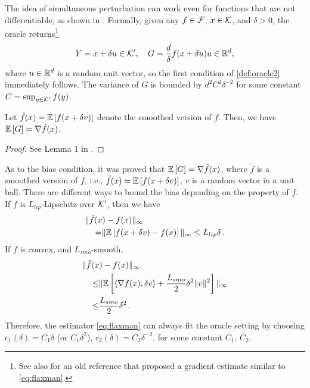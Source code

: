The idea of simultaneous perturbation can work even for functions that are not differentiable, as shown in \cite{flaxman2005online}. 
Formally,  
given any $f \in \mathcal{F}$, $x \in \mathcal{K}$, and $\delta >0$, the oracle returns\footnote{See also \cite[pp.~58-60]{kushcla} for an old reference that proposed a gradient estimate similar to \eqref{eq:flaxman}.}   
\begin{align}
 Y = x+\delta u \in \mathcal{K}', \quad
 G = \dfrac{d}{\delta}f(x+\delta u)u \in \mathbb{R}^d, \label{eq:flaxman}
\end{align}
where $u\in \mathbb{R}^d$ is a random unit vector, so the first condition of \cref{def:oracle2} immediately follows. 
The variance of $G$ is bounded by $d^2C^2 \delta^{-2}$ for some constant $C = \sup_{y\in \mathcal{K}'}f(y)$. 
\begin{proposition}
Let $\tilde{f}(x) = \mathbb{E}\left[f(x+\delta v)\right]$ denote the smoothed version of $f$. Then, we have
$\mathbb{E}\left[G\right] = \nabla \tilde{f}(x)$.
\end{proposition}
\begin{proof}
 See Lemma 1 in \citep{flaxman2005online}.
\end{proof}
 As to the bias condition, it was proved that $\mathbb{E}\left[G\right] = \nabla \tilde{f}(x)$, where $\tilde{f}$ is a smoothed version of $f$, i.e.,
$\tilde{f}(x) = \mathbb{E}\left[f(x+\delta v)\right]$,
$v$ is a random vector in a unit ball. There are different ways to bound the bias depending on the property of $f$.
If $f$ is $L_{lip}$-Lipschitz over $\mathcal{K}'$, then we have
\begin{align*}
\MoveEqLeft
\norm{\tilde{f}(x)-f(x)}_\infty \\
=&\norm{\EE{f(x+\delta v)-f(x)}}_\infty
\le L_{lip} \delta \,.
\end{align*}
If $f$ is convex, and $L_{smo}$-smooth, 
\begin{align*}
\MoveEqLeft
\norm{\tilde{f}(x)-f(x)}_\infty \\
\le& \norm{\EE{\ip{\nabla f(x), \delta v}+\dfrac{L_{smo}}{2}\delta^2\norm{v}^2}}_\infty\\
\le &\dfrac{L_{smo}}{2}\delta^2 \,.
\end{align*}
Therefore, the estimator \eqref{eq:flaxman} can always fit the oracle setting by choosing $c_1(\delta) = C_1 \delta$ (or $C_1\delta^2$), $c_2(\delta) = C_2 \delta^{-2}$, for some constant $C_1$, $C_2$.

